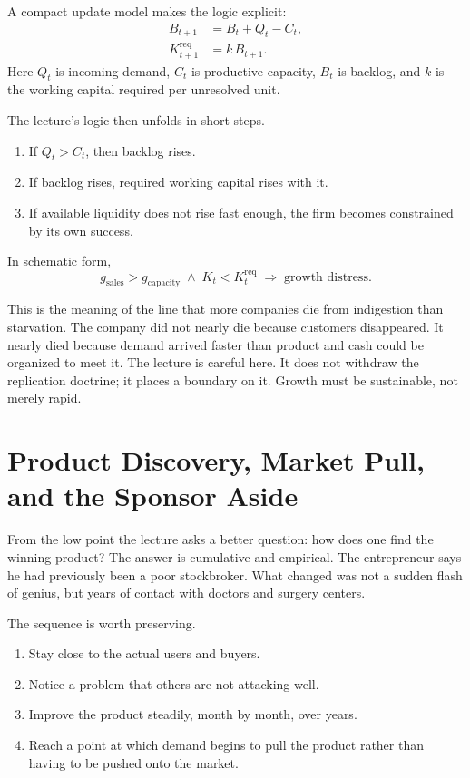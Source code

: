 A compact update model makes the logic explicit:
\begin{align}
B_{t+1} &= B_t + Q_t - C_t,\\
K_{t+1}^{\mathrm{req}} &= k\,B_{t+1}.
\end{align}
Here $Q_t$ is incoming demand, $C_t$ is productive capacity, $B_t$ is backlog, and $k$ is the working capital required per unresolved unit.

The lecture's logic then unfolds in short steps.
\begin{enumerate}
\item If $Q_t > C_t$, then backlog rises.
\item If backlog rises, required working capital rises with it.
\item If available liquidity does not rise fast enough, the firm becomes constrained by its own success.
\end{enumerate}
In schematic form,
\begin{equation}
g_{\mathrm{sales}} > g_{\mathrm{capacity}}
\;\land\;
K_t < K_t^{\mathrm{req}}
\;\Rightarrow\;
\text{growth distress}.
\end{equation}

This is the meaning of the line that more companies die from indigestion than starvation. The company did not nearly die because customers disappeared. It nearly died because demand arrived faster than product and cash could be organized to meet it. The lecture is careful here. It does not withdraw the replication doctrine; it places a boundary on it. Growth must be sustainable, not merely rapid.

\section{Product Discovery, Market Pull, and the Sponsor Aside}

From the low point the lecture asks a better question: how does one find the winning product? The answer is cumulative and empirical. The entrepreneur says he had previously been a poor stockbroker. What changed was not a sudden flash of genius, but years of contact with doctors and surgery centers.

The sequence is worth preserving.
\begin{enumerate}
\item Stay close to the actual users and buyers.
\item Notice a problem that others are not attacking well.
\item Improve the product steadily, month by month, over years.
\item Reach a point at which demand begins to pull the product rather than having to be pushed onto the market.
\end{enumerate}

